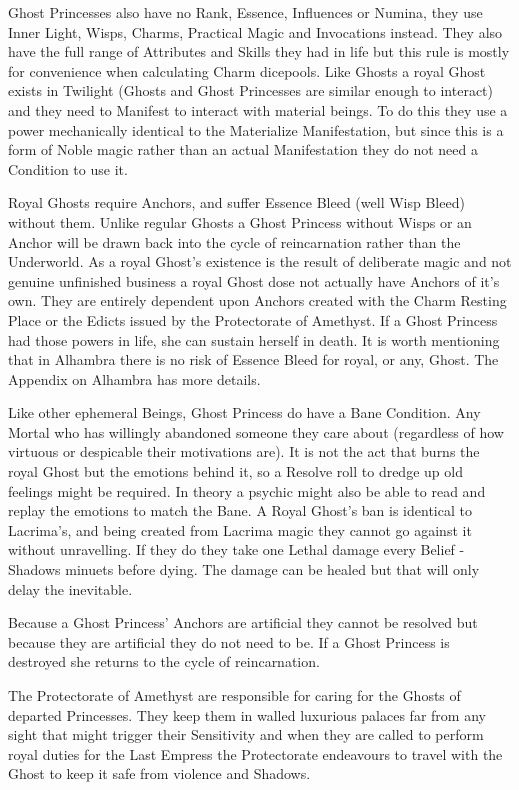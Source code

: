 Ghost Princesses also have no Rank, Essence, Influences or Numina, they use Inner Light, Wisps, Charms, Practical Magic and Invocations instead. They also have the full range of Attributes and Skills they had in life but this rule is mostly for convenience when calculating Charm dicepools. Like Ghosts a royal Ghost exists in Twilight (Ghosts and Ghost Princesses are similar enough to interact) and they need to Manifest to interact with material beings. To do this they use a power mechanically identical to the Materialize Manifestation, but since this is a form of Noble magic rather than an actual Manifestation they do not need a Condition to use it. 

Royal Ghosts require Anchors, and suffer Essence Bleed (well Wisp Bleed) without them. Unlike regular Ghosts a Ghost Princess without Wisps or an Anchor will be drawn back into the cycle of reincarnation rather than the Underworld. As a royal Ghost's existence is the result of deliberate magic and not genuine unfinished business a royal Ghost dose not actually have Anchors of it's own. They are entirely dependent upon Anchors created with the Charm Resting Place or the Edicts issued by the Protectorate of Amethyst. If a Ghost Princess had those powers in life, she can sustain herself in death. It is worth mentioning that in Alhambra there is no risk of Essence Bleed for royal, or any, Ghost. The Appendix on Alhambra has more details. 

Like other ephemeral Beings, Ghost Princess do have a Bane Condition. Any Mortal who has willingly abandoned someone they care about (regardless of how virtuous or despicable their motivations are). It is not the act that burns the royal Ghost but the emotions behind it, so a Resolve roll to dredge up old feelings might be required. In theory a psychic might also be able to read and replay the emotions to match the Bane. A Royal Ghost's ban is identical to Lacrima's, and being created from Lacrima magic they cannot go against it without unravelling. If they do they take one Lethal damage every Belief - Shadows minuets before dying. The damage can be healed but that will only delay the inevitable.

Because a Ghost Princess' Anchors are artificial they cannot be resolved but because they are artificial they do not need to be. If a Ghost Princess is destroyed she returns to the cycle of reincarnation.

The Protectorate of Amethyst are responsible for caring for the Ghosts of departed Princesses. They keep them in walled luxurious palaces far from any sight that might trigger their Sensitivity and when they are called to perform royal duties for the Last Empress the Protectorate endeavours to travel with the Ghost to keep it safe from violence and Shadows. 


